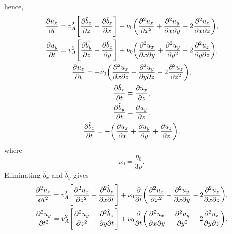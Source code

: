 hence,
\begin{gather}
    \pdv{u_x}{t} = v_A^2\qty[\pdv{\hat{b}_x}{z} - \pdv{\hat{b}_z}{x}] + \nu_0\qty(\pdv[2]{u_x}{x} + \pdv{u_y}{x}{y} - 2\pdv[2]{u_z}{x}{z}), \\
    \pdv{u_y}{t} = v_A^2\qty[\pdv{\hat{b_y}}{z} - \pdv{\hat{b}_z}{y}] + \nu_0\qty(\pdv{u_x}{x}{y} + \pdv[2]{u_y}{y} - 2\pdv{u_z}{y}{z}), \\
    \label{eq:uz_eqn1}
    \pdv{u_z}{t} = -\nu_0\qty(\pdv{u_x}{x}{z} + \pdv{u_y}{y}{z} - 2\pdv[2]{u_z}{z}), \\
    \pdv{\hat{b}_x}{t} = \pdv{u_x}{z}, \\
    \pdv{\hat{b}_y}{t} = \pdv{u_y}{z}, \\
        \label{eq:bz_eqn1}
    \pdv{\hat{b}_z}{t} = -\qty(\pdv{u_x}{x} + \pdv{u_y}{y} + \pdv{u_z}{z}),
\end{gather}
where
\[\nu_0 = \frac{\eta_0}{3\rho}.\]
Eliminating $\hat{b}_x$ and $\hat{b}_y$ gives
\begin{gather}
    \label{eq:ux_eqn1}
    \pdv[2]{u_x}{t} = v_A^2\qty[\pdv[2]{u_x}{z} - \pdv{\hat{b}_z}{x}{t}] + \nu_0\pdv{}{t}\qty(\pdv[2]{u_x}{x} + \pdv{u_y}{x}{y} - 2\pdv[2]{u_z}{x}{z}), \\
    \label{eq:uy_eqn1}
    \pdv[2]{u_y}{t} = v_A^2\qty[\pdv[2]{u_y}{z} - \pdv{\hat{b}_z}{y}{t}] + \nu_0\pdv{}{t}\qty(\pdv{u_x}{x}{y} + \pdv[2]{u_y}{y} - 2\pdv{u_z}{y}{z}).
\end{gather}

